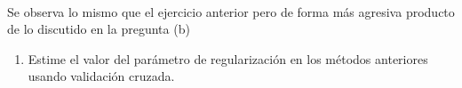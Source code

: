 \documentclass[11pt]{article}
\begin{document}
    \begin{center}
    \end{center}
    { \hspace*{\fill} \\}
    
    Se observa lo mismo que el ejercicio anterior pero de forma más agresiva
producto de lo discutido en la pregunta (b)

    \begin{enumerate}
\def\labelenumi{(\alph{enumi})}
\setcounter{enumi}{4}
\itemsep1pt\parskip0pt
\item
  Estime el valor del parámetro de regularización en los métodos
  anteriores usando validación cruzada.
\end{enumerate}
\end{document}
